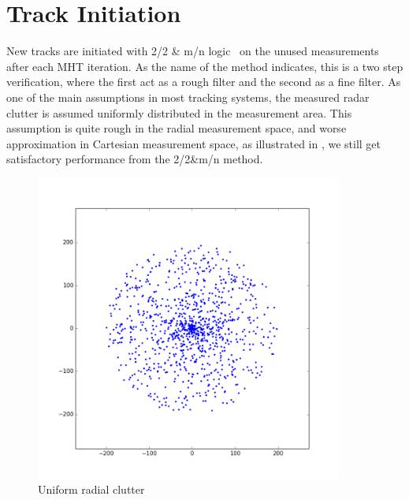 \section{Track Initiation}
New tracks are initiated with 2/2 \& m/n logic~\cite{Vo2015} on the unused measurements after each MHT iteration. As the name of the method indicates, this is a two step verification, where the first act as a rough filter and the second as a fine filter. As one of the main assumptions in most tracking systems, the measured radar clutter is assumed uniformly distributed in the measurement area. This assumption is quite rough in the radial measurement space, and worse approximation in Cartesian measurement space, as illustrated in , we still get satisfactory performance from the 2/2\&m/n method.
\begin{figure}
\centering
\begin{minipage}{0.45\textwidth}
\includegraphics[width=0.9\textwidth]{Figures/clutterRadial.png}
\caption{Uniform radial clutter}\label{fig:clutter_radial}
\end{minipage}\hfill
\begin{minipage}{0.45\textwidth}

\end{minipage}
\end{figure}
